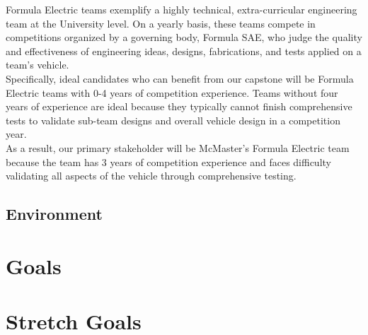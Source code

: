 \documentclass{article}
\begin{document}
Formula Electric teams exemplify a highly technical, extra-curricular engineering team at the University level. On a yearly basis, these teams compete in competitions organized by a governing body, Formula SAE, who judge the quality and effectiveness of engineering ideas, designs, fabrications, and tests applied on a team's vehicle. \\

Specifically, ideal candidates who can benefit from our capstone will be Formula Electric teams with 0-4 years of competition experience. Teams without four years of experience are ideal because they typically cannot finish comprehensive tests to  validate sub-team designs and overall vehicle design in a competition year. \\

As a result, our primary stakeholder will be McMaster's Formula Electric team because the team has 3 years of competition experience and faces difficulty validating all aspects of the vehicle through comprehensive testing.




\subsection{Environment}


\section{Goals}

\section{Stretch Goals}
\end{document}
